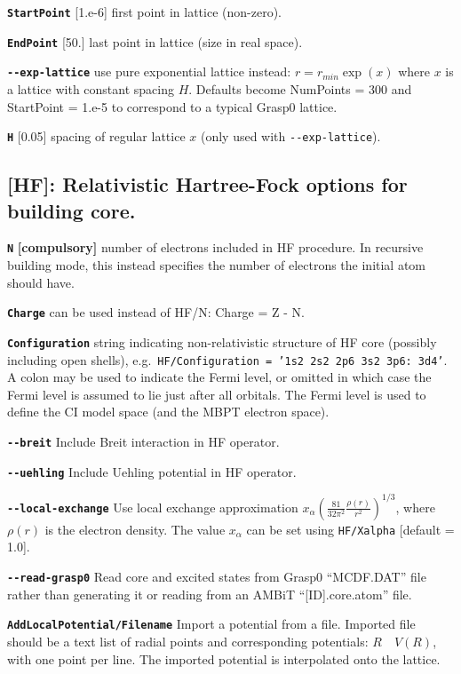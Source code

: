 \documentclass[a4paper,11pt]{article}
\newcommand{\option}[1]{\smallskip\noindent\textbf{\texttt{#1}}}
\newcommand{\code}[1]{\texttt{#1}}
\begin{document}
\option{StartPoint} [1.e-6] first point in lattice (non-zero).

\option{EndPoint} [50.] last point in lattice (size in real space).

\option{-{}-exp-lattice} use pure exponential lattice instead: $r = r_{min}\exp(x)$ where $x$ is a lattice with constant spacing $H$. Defaults become NumPoints = 300 and StartPoint = 1.e-5 to correspond to a typical Grasp0 lattice.

\option{H} [0.05] spacing of regular lattice $x$ (only used with \texttt{-{}-exp-lattice}).

\subsection{[HF]: Relativistic Hartree-Fock options for building core.}

\option{N} \textbf{[compulsory]} number of electrons included in HF procedure. In recursive building mode, this instead specifies the number of electrons the initial atom should have.

\option{Charge} can be used instead of HF/N: Charge = Z - N.

\option{Configuration} string indicating non-relativistic structure of HF core (possibly including open shells), e.g.~\texttt{HF/Configuration = '1s2 2s2 2p6 3s2 3p6: 3d4'}. A colon may be used to indicate the Fermi level, or omitted in which case the Fermi level is assumed to lie just after all orbitals. The Fermi level is used to define the CI model space (and the MBPT electron space).

\option{-{}-breit} Include Breit interaction in HF operator.

\option{-{}-uehling} Include Uehling potential in HF operator.

\option{-{}-local-exchange} Use local exchange approximation $x_\alpha \left(\frac{81}{32\pi^2} \frac{\rho(r)}{r^2}\right)^{1/3}$, where $\rho(r)$ is the electron density. The value $x_\alpha$ can be set using \code{HF/Xalpha} [default = 1.0].

\option{-{}-read-grasp0} Read core and excited states from Grasp0 ``MCDF.DAT'' file rather than generating it or reading from an AMBiT ``[ID].core.atom'' file.

\option{AddLocalPotential/Filename} Import a potential from a file. Imported file should be a text list of radial points and corresponding potentials: $R \quad V(R)$, with one point per line. The imported potential is interpolated onto the lattice.
\end{document}
